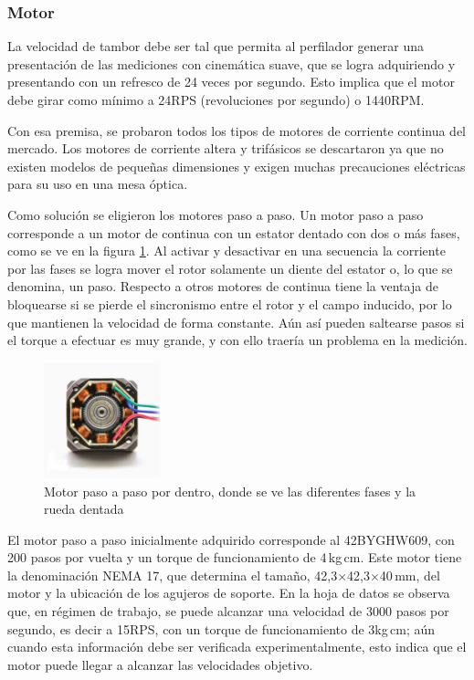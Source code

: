 \subsubsection{Motor}

La velocidad de tambor debe ser tal que permita al perfilador generar una presentación de las mediciones con cinemática suave, que se logra adquiriendo y presentando con un refresco de 24 veces por segundo. Esto implica que el motor debe girar como mínimo a 24RPS (revoluciones por segundo) o 1440RPM.

Con esa premisa, se probaron todos los tipos de motores de corriente continua del mercado. Los motores de corriente altera y trifásicos se descartaron ya que no existen modelos de pequeñas dimensiones y exigen muchas precauciones eléctricas para su uso en una mesa óptica.

Como solución se eligieron los motores paso a paso. Un motor paso a paso corresponde a un motor de continua con un estator dentado con dos o más fases, como se ve en la figura \ref{fig:stepper_inner}. Al activar y desactivar en una secuencia la corriente por las fases se logra mover el rotor solamente un diente del estator o, lo que se denomina, un paso. Respecto a otros motores de continua tiene la ventaja de bloquearse si se pierde el sincronismo entre el rotor y el campo inducido, por lo que mantienen la velocidad de forma constante. Aún así pueden saltearse pasos si el torque a efectuar es muy grande, y con ello traería un problema en la medición. 

\begin{figure}[H]
\centering
\includegraphics[width=0.3\textwidth]{fig/stepper_inner}
\caption{Motor paso a paso por dentro, donde se ve las diferentes fases y la rueda dentada}
\label{fig:stepper_inner}
\end{figure}

El motor paso a paso inicialmente adquirido corresponde al 42BYGHW609\cite{42BYGHW609}, con 200 pasos por vuelta y un torque de funcionamiento de 4$\,$kg$\,$cm. Este motor tiene la denominación NEMA 17, que determina el tamaño, 42,3$\times$42,3$\times$40$\,$mm, del motor y la ubicación de los agujeros de soporte. En la hoja de datos se observa que, en régimen de trabajo, se puede alcanzar una velocidad de 3000 pasos por segundo, es decir a 15RPS, con un torque de funcionamiento de 3kg$\,$cm; aún cuando esta información debe ser verificada experimentalmente, esto indica que el motor puede llegar a alcanzar las velocidades objetivo. 

